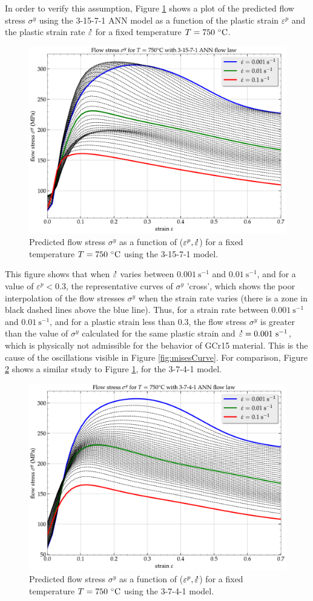 \documentclass[algorithms,article,submit,pdftex,moreauthors]{Definitions/mdpi}
\DeclareRobustCommand{\mdot}[1]{\accentset{\mbox{\bfseries .}}{#1}}
\DeclareRobustCommand{\ps}{\text{s}^{-1}}
\begin{document}
In order to verify this assumption, Figure \ref{fig:ShapeOF1} shows a plot of the predicted flow stress $\sigma^y$ using the 3-15-7-1 ANN model as a function of the plastic strain $\varepsilon^p$ and the plastic strain rate $\mdot\varepsilon$ for a fixed temperature $T=750~\celsius$.
\begin{figure}[!ht]
\centering
\includegraphics[width=0.75\columnwidth]{Figures/Shape-3-15-7-1}
\caption{Predicted flow stress $\sigma^y$ as a function of ($\varepsilon^p, \mdot\varepsilon$) for a fixed temperature $T=750~\celsius$ using the 3-15-7-1 model.}
\label{fig:ShapeOF1}
\end{figure}
This figure shows that when $\mdot\varepsilon$ varies between $0.001~\ps$ and $0.01~\ps$, and for a value of $\varepsilon^p<0.3$, the representative curves of $\sigma^y$ 'cross', which shows the poor interpolation of the flow stresses $\sigma^y$ when the strain rate varies (there is a zone in black dashed lines above the blue line).
Thus, for a strain rate between $0.001~\ps$ and $0.01~\ps$, and for a plastic strain less than $0.3$, the flow stress $\sigma^y$ is greater than the value of $\sigma^y$ calculated for the same plastic strain and $\mdot\varepsilon=0.001~\ps$, which is physically not admissible for the behavior of GCr15 material.
This is the cause of the oscillations visible in Figure \ref{fig:misesCurve}.
For comparison, Figure \ref{fig:ShapeOF2} shows a similar study to Figure \ref{fig:ShapeOF1}, for the 3-7-4-1 model.
\begin{figure}[!ht]
\centering
\includegraphics[width=0.75\columnwidth]{Figures/Shape-3-7-4-1}
\caption{Predicted flow stress $\sigma^y$ as a function of ($\varepsilon^p, \mdot\varepsilon$) for a fixed temperature $T=750~\celsius$ using the 3-7-4-1 model.}
\label{fig:ShapeOF2}
\end{figure}
\end{document}
